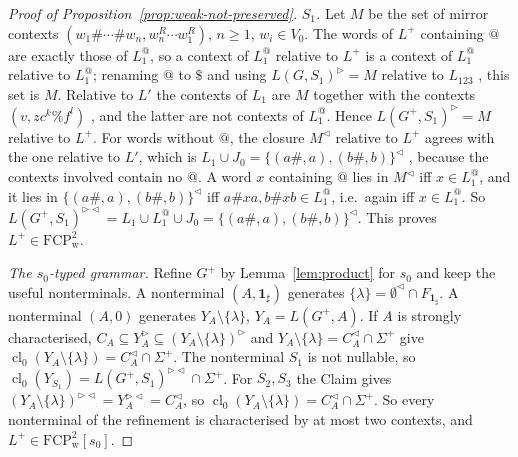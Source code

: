 \documentclass[11pt]{article}
\numberwithin{equation}{section}
\theoremstyle{plain}
\theoremstyle{definition}
\theoremstyle{remark}
\theoremstyle{plain}
\newcommand{\eps}{\lambda}
\newcommand{\R}{^{\rhd}}
\newcommand{\Lc}{^{\lhd}}
\newcommand{\RL}{^{\rhd\lhd}}
\newcommand{\cl}{\operatorname{cl}}
\newcommand{\one}{\mathbf 1_\sharp}
\newcommand{\FCP}[2]{\mathrm{FCP}^{#1}_{\mathrm{#2}}}
\newcommand{\tFCP}[3]{\mathrm{FCP}^{#1}_{\mathrm{#2}}[#3]}
\begin{document}
\begin{proof}[Proof of Proposition~\ref{prop:weak-not-preserved}]
\emph{$S_1$.}  Let $M$ be the set of mirror contexts
$(w_1\#\cdots\#w_n,w_n^R\cdots w_1^R)$, $n\ge1$, $w_i\in V_0$.  The words
of $L^+$ containing $@$ are exactly those of $L_1^@$, so a context of $L_1^@$
relative to $L^+$ is a context of $L_1^@$ relative to $L_1^@$; renaming $@$ to
$\$$ and using $L(G,S_1)\R=M$ relative to $L_{123}$
\citep[proof of Lemma~8]{ky2017}, this set is $M$.  Relative to $L'$ the
contexts of $L_1$ are $M$ together with the contexts $(v,zc^k\%f^l)$
\citep[proof of Lemma~12]{ky2017}, and the latter are not contexts of
$L_1^@$.  Hence $L(G^+,S_1)\R=M$ relative to $L^+$.  For words without $@$,
the closure $M\Lc$ relative to $L^+$ agrees with the one relative to $L'$,
which is $L_1\cup J_0=\{(a\#,a),(b\#,b)\}\Lc$
\citep[proof of Lemma~12]{ky2017}, because the
contexts involved contain no $@$.  A word $x$ containing $@$ lies in $M\Lc$
iff $x\in L_1^@$, and it lies in $\{(a\#,a),(b\#,b)\}\Lc$ iff
$a\#xa,b\#xb\in L_1^@$, i.e.\ again iff $x\in L_1^@$.  So
$L(G^+,S_1)\RL=L_1\cup L_1^@\cup J_0=\{(a\#,a),(b\#,b)\}\Lc$.  This proves
$L^+\in\FCP2{w}$.

\emph{The $s_0$-typed grammar.}  Refine $G^+$ by Lemma~\ref{lem:product}
for $s_0$ and keep the useful nonterminals.  A nonterminal $(A,\one)$
generates $\{\eps\}=\emptyset\Lc\cap F_{\one}$.  A nonterminal $(A,0)$ generates
$Y_A\setminus\{\eps\}$, $Y_A=L(G^+,A)$.  If $A$ is strongly characterised,
$C_A\subseteq Y_A\R\subseteq(Y_A\setminus\{\eps\})\R$ and
$Y_A\setminus\{\eps\}=C_A\Lc\cap\Sigma^+$ give
$\cl_0(Y_A\setminus\{\eps\})=C_A\Lc\cap\Sigma^+$.  The nonterminal $S_1$ is not
nullable, so $\cl_0(Y_{S_1})=L(G^+,S_1)\RL\cap\Sigma^+$.  For $S_2,S_3$ the
Claim gives $(Y_A\setminus\{\eps\})\RL=Y_A\RL=C_A\Lc$, so
$\cl_0(Y_A\setminus\{\eps\})=C_A\Lc\cap\Sigma^+$.  So every nonterminal of the
refinement is characterised by at most two contexts, and
$L^+\in\tFCP2{w}{s_0}$.


\end{proof}
\end{document}
